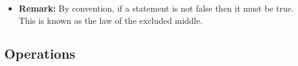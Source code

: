 \documentclass[11pt,twoside]{report}
\begin{document}
\begin{itemize}
\item \textbf{Remark:} By convention, if a statement is not false then it must be true. This is known as the law of the excluded middle. 


%
%  
%  
%  
%
%
%
%
%
%
%
%  
%

\end{itemize}

\subsection{Operations} 
\end{document}
